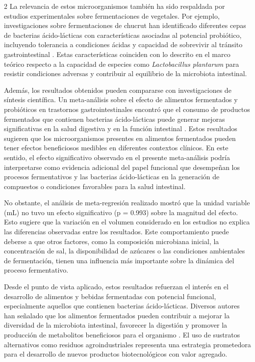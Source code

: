 \begin{multicols}{2}
La relevancia de estos microorganismos también ha sido respaldada por estudios experimentales sobre fermentaciones de vegetales. Por ejemplo, investigaciones sobre fermentaciones de chucrut han identificado diferentes cepas de bacterias ácido-lácticas con características asociadas al potencial probiótico, incluyendo tolerancia a condiciones ácidas y capacidad de sobrevivir al tránsito gastrointestinal \citep{semedolemsaddek2018}. Estas características coinciden con lo descrito en el marco teórico respecto a la capacidad de especies como \textit{Lactobacillus plantarum} para resistir condiciones adversas y contribuir al equilibrio de la microbiota intestinal.

Además, los resultados obtenidos pueden compararse con investigaciones de síntesis científica. Un meta-análisis sobre el efecto de alimentos fermentados y probióticos en trastornos gastrointestinales encontró que el consumo de productos fermentados que contienen bacterias ácido-lácticas puede generar mejoras significativas en la salud digestiva y en la función intestinal \citep{dimidi2014, eales2017}. Estos resultados sugieren que los microorganismos presentes en alimentos fermentados pueden tener efectos beneficiosos medibles en diferentes contextos clínicos. En este sentido, el efecto significativo observado en el presente meta-análisis podría interpretarse como evidencia adicional del papel funcional que desempeñan los procesos fermentativos y las bacterias ácido-lácticas en la generación de compuestos o condiciones favorables para la salud intestinal.

No obstante, el análisis de meta-regresión realizado mostró que la unidad variable (mL) no tuvo un efecto significativo (p = 0.993) sobre la magnitud del efecto. Esto sugiere que la variación en el volumen considerado en los estudios no explica las diferencias observadas entre los resultados. Este comportamiento puede deberse a que otros factores, como la composición microbiana inicial, la concentración de sal, la disponibilidad de azúcares o las condiciones ambientales de fermentación, tienen una influencia más importante sobre la dinámica del proceso fermentativo.

Desde el punto de vista aplicado, estos resultados refuerzan el interés en el desarrollo de alimentos y bebidas fermentadas con potencial funcional, especialmente aquellos que contienen bacterias ácido-lácticas. Diversos autores han señalado que los alimentos fermentados pueden contribuir a mejorar la diversidad de la microbiota intestinal, favorecer la digestión y promover la producción de metabolitos beneficiosos para el organismo \citep{marco2017}. El uso de sustratos alternativos como residuos agroindustriales representa una estrategia prometedora para el desarrollo de nuevos productos biotecnológicos con valor agregado.


\end{multicols}
